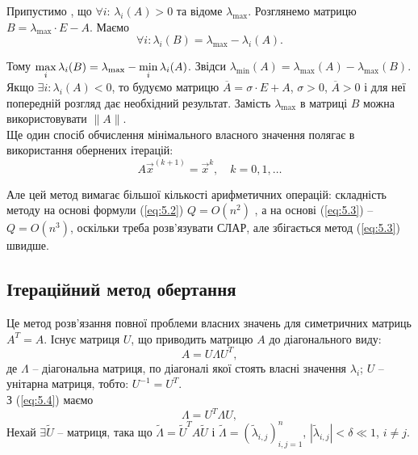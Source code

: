 \begin{enumerate}
	Припустимо , що $\forall i$: $\lambda_i(A) > 0$ та відоме $\lambda_{\max}$. Розглянемо матрицю $B = \lambda_{\max}\cdot E - A$. Маємо \[ \forall i: \lambda_i(B) = \lambda_{\max} - \lambda_i(A). \]

	Тому $\displaystyle\max\limits_i \lambda_i (B) = \lambda_{\max} - \displaystyle\min\limits_i \lambda_i(A)$. Звідси $\lambda_{\min}(A) = \lambda_{\max}(A) - \lambda_{\max}(B)$. \\

	Якщо $\exists i: \lambda_i(A) < 0$, то будуємо матрицю $ \overline{A} = \sigma \cdot E + A$, $\sigma > 0$, $\overline{A} > 0$ і для неї попередній розгляд дає необхідний результат. Замість $\lambda_{\max}$ в матриці $B$ можна використовувати $\|A\|$. \\

	Ще один спосіб обчислення мінімального власного значення полягає в використання обернених ітерацій:
	\begin{equation}
		\label{eq:5.3}
		A \vec x^{(k+1)} = \vec x^k, \quad k = 0, 1, \ldots
	\end{equation}

	Але цей метод вимагає більшої кількості арифметичних операцій: складність методу на основі формули (\ref{eq:5.2}) $Q = O(n^2)$ , а на основі (\ref{eq:5.3}) -- $Q = O(n^3)$, оскільки треба розв'язувати СЛАР, але збігається метод (\ref{eq:5.3}) швидше.
\end{enumerate}

\subsection{Ітераційний метод обертання}
Це метод розв'язання повної проблеми власних значень для симетричних матриць $A^T = A$. Існує матриця $U$, що приводить матрицю $A$ до діагонального виду:
\begin{equation}
	\label{eq:5.4}
	A = U \Lambda U^T,
\end{equation}
де $\Lambda$ -- діагональна матриця, по діагоналі якої стоять власні значення $\lambda_i$; $U$ -- унітарна матриця, тобто: $U^{-1}=U^T$. \\

З (\ref{eq:5.4}) маємо
\begin{equation}
	\label{eq:5.5}
	\Lambda = U^T \Lambda U,
\end{equation}
Нехай $\exists \tilde U$ -- матриця, така що $\tilde \Lambda = \tilde U^T A \tilde U$ і $\tilde \Lambda = \left(\tilde \lambda_{i,j}\right)_{i,j=1}^n$, $\left|\tilde \lambda_{i,j}\right| < \delta \ll 1$, $i \ne j$. \\

